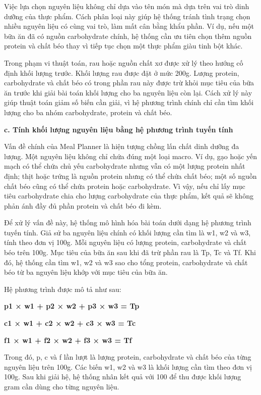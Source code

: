 Việc lựa chọn nguyên liệu không chỉ dựa vào tên món mà dựa trên vai trò dinh dưỡng của thực phẩm. Cách phân loại này giúp hệ thống tránh tình trạng chọn nhiều nguyên liệu có cùng vai trò, làm mất cân bằng khẩu phần. Ví dụ, nếu một bữa ăn đã có nguồn carbohydrate chính, hệ thống cần ưu tiên chọn thêm nguồn protein và chất béo thay vì tiếp tục chọn một thực phẩm giàu tinh bột khác.

Trong phạm vi thuật toán, rau hoặc nguồn chất xơ được xử lý theo hướng cố định khối lượng trước. Khối lượng rau được đặt ở mức 200g. Lượng protein, carbohydrate và chất béo có trong phần rau này được trừ khỏi mục tiêu của bữa ăn trước khi giải bài toán khối lượng cho ba nguyên liệu còn lại. Cách xử lý này giúp thuật toán giảm số biến cần giải, vì hệ phương trình chính chỉ cần tìm khối lượng cho ba nhóm carbohydrate, protein và chất béo.

\textbf{c. Tính khối lượng nguyên liệu bằng hệ phương trình tuyến tính}

Vấn đề chính của Meal Planner là hiện tượng chồng lấn chất dinh dưỡng đa lượng. Một nguyên liệu không chỉ chứa đúng một loại macro. Ví dụ, gạo hoặc yến mạch có thể chứa chủ yếu carbohydrate nhưng vẫn có một lượng protein nhất định; thịt hoặc trứng là nguồn protein nhưng có thể chứa chất béo; một số nguồn chất béo cũng có thể chứa protein hoặc carbohydrate. Vì vậy, nếu chỉ lấy mục tiêu carbohydrate chia cho lượng carbohydrate của thực phẩm, kết quả sẽ không phản ánh đầy đủ phần protein và chất béo đi kèm.

Để xử lý vấn đề này, hệ thống mô hình hóa bài toán dưới dạng hệ phương trình tuyến tính. Giả sử ba nguyên liệu chính có khối lượng cần tìm là w1, w2 và w3, tính theo đơn vị 100g. Mỗi nguyên liệu có lượng protein, carbohydrate và chất béo trên 100g. Mục tiêu của bữa ăn sau khi đã trừ phần rau là Tp, Tc và Tf. Khi đó, hệ thống cần tìm w1, w2 và w3 sao cho tổng protein, carbohydrate và chất béo từ ba nguyên liệu khớp với mục tiêu của bữa ăn.

Hệ phương trình được mô tả như sau:

\textbf{p1 × w1 + p2 × w2 + p3 × w3 = Tp}

\textbf{c1 × w1 + c2 × w2 + c3 × w3 = Tc}

\textbf{f1 × w1 + f2 × w2 + f3 × w3 = Tf}

Trong đó, p, c và f lần lượt là lượng protein, carbohydrate và chất béo của từng nguyên liệu trên 100g. Các biến w1, w2 và w3 là khối lượng cần tìm theo đơn vị 100g. Sau khi giải hệ, hệ thống nhân kết quả với 100 để thu được khối lượng gram cần dùng cho từng nguyên liệu.

